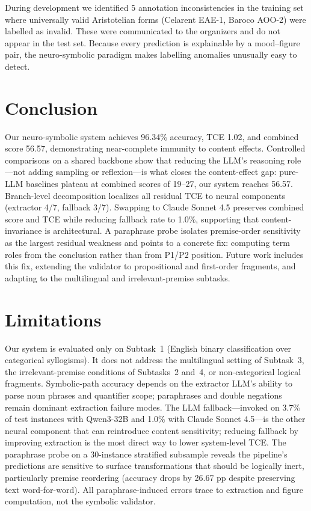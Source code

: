 \documentclass[11pt]{article}
\begin{document}
During development we identified 5 annotation inconsistencies in the training set where universally valid Aristotelian forms (Celarent EAE-1, Baroco AOO-2) were labelled as invalid. These were communicated to the organizers and do not appear in the test set. Because every prediction is explainable by a mood--figure pair, the neuro-symbolic paradigm makes labelling anomalies unusually easy to detect.


\section{Conclusion}

Our neuro-symbolic system achieves 96.34\% accuracy, TCE 1.02, and combined score 56.57, demonstrating near-complete immunity to content effects. Controlled comparisons on a shared backbone show that reducing the LLM's reasoning role---not adding sampling or reflexion---is what closes the content-effect gap: pure-LLM baselines plateau at combined scores of 19--27, our system reaches 56.57. Branch-level decomposition localizes all residual TCE to neural components (extractor 4/7, fallback 3/7). Swapping to Claude Sonnet 4.5 preserves combined score and TCE while reducing fallback rate to 1.0\%, supporting that content-invariance is architectural. A paraphrase probe isolates premise-order sensitivity as the largest residual weakness and points to a concrete fix: computing term roles from the conclusion rather than from P1/P2 position. Future work includes this fix, extending the validator to propositional and first-order fragments, and adapting to the multilingual and irrelevant-premise subtasks.


\section*{Limitations}

Our system is evaluated only on Subtask~1 (English binary classification over categorical syllogisms). It does not address the multilingual setting of Subtask~3, the irrelevant-premise conditions of Subtasks~2 and~4, or non-categorical logical fragments. Symbolic-path accuracy depends on the extractor LLM's ability to parse noun phrases and quantifier scope; paraphrases and double negations remain dominant extraction failure modes. The LLM fallback---invoked on 3.7\% of test instances with Qwen3-32B and 1.0\% with Claude Sonnet 4.5---is the other neural component that can reintroduce content sensitivity; reducing fallback by improving extraction is the most direct way to lower system-level TCE. The paraphrase probe on a 30-instance stratified subsample reveals the pipeline's predictions are sensitive to surface transformations that should be logically inert, particularly premise reordering (accuracy drops by 26.67 pp despite preserving text word-for-word). All paraphrase-induced errors trace to extraction and figure computation, not the symbolic validator.
\end{document}
